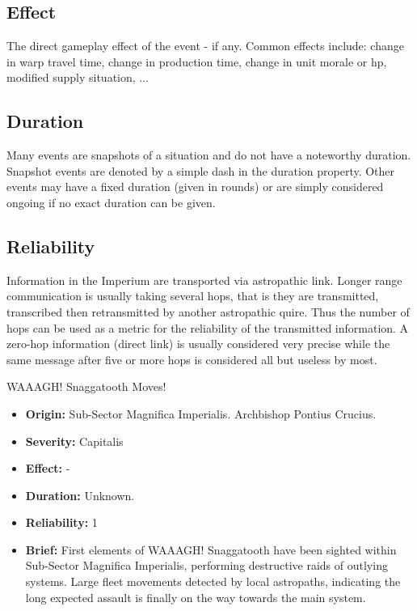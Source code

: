 \subsection{Effect}
The direct gameplay effect of the event - if any. 
Common effects include: change in warp travel time, change in production time, change in unit morale or hp, modified supply situation, ...

\subsection{Duration}
Many events are snapshots of a situation and do not have a noteworthy duration. Snapshot events are denoted by a simple dash in the duration property. Other events may have a fixed duration (given in rounds) or are simply considered ongoing if no exact duration can be given.

\subsection{Reliability}
Information in the Imperium are transported via astropathic link. Longer range communication is usually taking several hops, that is they are transmitted, transcribed then retransmitted  by another astropathic quire. Thus the number of hops can be used as a metric for the reliability of the transmitted information. A zero-hop information (direct link) is usually considered very precise while the same message after five or more hops is considered all but useless by most.
\begin{DndSidebar}{WAAAGH! Snaggatooth Moves!}
\begin{itemize}
	\item \textbf{Origin:} Sub-Sector Magnifica Imperialis. Archbishop Pontius Crucius.
	\item \textbf{Severity:} Capitalis
	\item \textbf{Effect:} -
	\item \textbf{Duration:} Unknown.
	\item \textbf{Reliability:} 1
	\item \textbf{Brief:} First elements of WAAAGH! Snaggatooth have been sighted within Sub-Sector Magnifica Imperialis, performing destructive raids of outlying systems. Large fleet movements detected by local astropaths, indicating the long expected assault is finally on the way towards the main system.

\end{itemize}
\end{DndSidebar}

